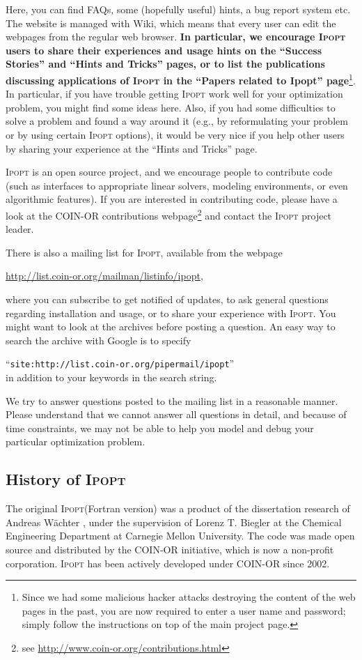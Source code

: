 \documentclass[10pt]{article}
\newcommand{\Ipopt}{\textsc{Ipopt}\xspace}
\begin{document}
Here, you can find FAQs, some (hopefully useful) hints, a bug report
system etc.  The website is managed with Wiki, which means that every
user can edit the webpages from the regular web browser.  {\bf In
  particular, we encourage \Ipopt users to share their experiences
  and usage hints on the ``Success Stories'' and ``Hints and Tricks''
  pages, or to list the publications discussing applications of
  \Ipopt in the ``Papers related to Ipopt'' page}\footnote{Since we
  had some malicious hacker attacks destroying the content of the web
  pages in the past, you are now required to enter a user name and
  password; simply follow the instructions on top of the main project
  page.}.  In particular, if you have trouble getting \Ipopt work
well for your optimization problem, you might find some ideas here.
Also, if you had some difficulties to solve a problem and found a way
around it (e.g., by reformulating your problem or by using certain
\Ipopt options), it would be very nice if you help other users by
sharing your experience at the ``Hints and Tricks'' page.

\Ipopt is an open source project, and we encourage people to
contribute code (such as interfaces to appropriate linear solvers,
modeling environments, or even algorithmic features).  If you are
interested in contributing code, please have a look at the COIN-OR
contributions webpage\footnote{see \url{http://www.coin-or.org/contributions.html}} and contact the \Ipopt
project leader.

There is also a mailing list for \Ipopt, available from the webpage
\begin{center}
\url{http://list.coin-or.org/mailman/listinfo/ipopt},
\end{center}
where you can subscribe to get notified of updates, to ask general
questions regarding installation and usage, or to share your
experience with \Ipopt. You might want to look at the archives before
posting a question.  An easy way to search the archive with Google is
to specify

``\texttt{site:http://list.coin-or.org/pipermail/ipopt}''\\
in addition to your keywords in the search string.

We try to answer questions posted to the mailing list in a reasonable
manner.  Please understand that we cannot answer all questions in
detail, and because of time constraints, we may not be able to help
you model and debug your particular optimization problem.

\subsection{History of \Ipopt}
The original \Ipopt (Fortran version) was a product of the
dissertation research of Andreas W\"achter \cite{WaechterPhD}, under
the supervision of Lorenz T. Biegler at the Chemical Engineering
Department at Carnegie Mellon University. The code was made open
source and distributed by the COIN-OR initiative, which is now a
non-profit corporation.  \Ipopt has been actively developed under
COIN-OR since 2002.
\end{document}
